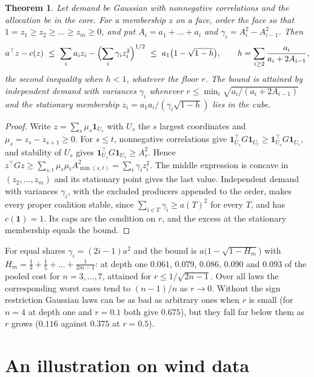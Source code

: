 \documentclass[11pt,a4paper]{article}
\newtheorem{theorem}{Theorem}
\theoremstyle{remark}
\newcommand{\one}{\mathbf 1}
\begin{document}
\begin{theorem}\label{thm:gauss}
Let demand be Gaussian with nonnegative correlations and the allocation be in
the core. For a membership $z$ on a face, order the face so that
$1=z_1\ge z_2\ge\dots\ge z_m\ge0$, and put $A_i=a_1+\dots+a_i$ and
$\gamma_i=A_i^2-A_{i-1}^2$. Then
\[
a^\top z-c(z)\ \le\ \sum_ia_iz_i-\Bigl(\sum_i\gamma_iz_i^2\Bigr)^{1/2}
\ \le\ a_1\bigl(1-\sqrt{1-h}\bigr),\qquad
h=\sum_{i\ge2}\frac{a_i}{a_i+2A_{i-1}},
\]
the second inequality when $h<1$, whatever the floor $r$. The bound is attained
by independent demand with variances $\gamma_i$ whenever
$r\le\min_i\sqrt{a_i/(a_i+2A_{i-1})}$ and the stationary membership
$z_i=a_1a_i/(\gamma_i\sqrt{1-h})$ lies in the cube.
\end{theorem}

\begin{proof}
Write $z=\sum_s\mu_s\one_{U_s}$ with $U_s$ the $s$ largest coordinates and
$\mu_s=z_s-z_{s+1}\ge0$. For $s\le t$, nonnegative correlations give
$\one_{U_s}^\top G\one_{U_t}\ge\one_{U_s}^\top G\one_{U_s}$, and stability of
$U_s$ gives $\one_{U_s}^\top G\one_{U_s}\ge A_s^2$. Hence
$z^\top Gz\ge\sum_{s,t}\mu_s\mu_tA_{\min(s,t)}^2=\sum_i\gamma_iz_i^2$. The middle
expression is concave in $(z_2,\dots,z_m)$ and its stationary point gives the
last value. Independent demand with variances $\gamma_i$, with the excluded
producers appended to the order, makes every proper coalition stable, since
$\sum_{i\in T}\gamma_i\ge a(T)^2$ for every $T$, and has $c(\one)=1$. Its caps
are the condition on $r$, and the excess at the stationary membership equals
the bound.
\end{proof}

For equal shares $\gamma_i=(2i-1)a^2$ and the bound is
$a\bigl(1-\sqrt{1-H_m}\bigr)$ with $H_m=\frac13+\frac15+\dots+\frac1{2m-1}$:
at depth one $0.061$, $0.079$, $0.086$, $0.090$ and $0.093$ of the pooled cost
for $n=3,\dots,7$, attained for $r\le1/\sqrt{2n-1}$. Over all laws the
corresponding worst cases tend to $(n-1)/n$ as $r\to0$. Without the sign
restriction Gaussian laws can be as bad as arbitrary ones when $r$ is small
(for $n=4$ at depth one and $r=0.1$ both give $0.675$), but they fall far below
them as $r$ grows ($0.116$ against $0.375$ at $r=0.5$).

\section{An illustration on wind data}\label{sec:data}
\end{document}
